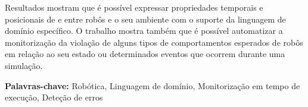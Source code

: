 Resultados mostram que é possível expressar propriedades temporais e posicionais de e entre robôs e o seu ambiente com o suporte da linguagem de domínio específico. O trabalho mostra também que é possível automatizar a monitorização da violação de alguns tipos de comportamentos esperados de robôs em relação ao seu estado ou determinados eventos que ocorrem durante uma simulação.



\vfill

\begin{flushleft}
\textbf{Palavras-chave:}
Robótica, Linguagem de domínio, Monitorização em tempo de execução, Deteção de erros
\end{flushleft}

